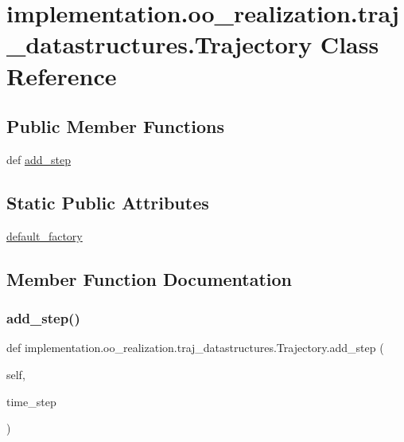 \hypertarget{classimplementation_1_1oo__realization_1_1traj__datastructures_1_1_trajectory}{}\section{implementation.\+oo\+\_\+realization.\+traj\+\_\+datastructures.\+Trajectory Class Reference}
\label{classimplementation_1_1oo__realization_1_1traj__datastructures_1_1_trajectory}
\subsection*{Public Member Functions}
\begin{DoxyCompactItemize}
\item 
def \hyperlink{classimplementation_1_1oo__realization_1_1traj__datastructures_1_1_trajectory_ac922486e57343dd01778b8d24455d9eb}{add\+\_\+step}
\end{DoxyCompactItemize}
\subsection*{Static Public Attributes}
\begin{DoxyCompactItemize}
\item 
\hyperlink{classimplementation_1_1oo__realization_1_1traj__datastructures_1_1_trajectory_ae72d432cf162b694f810b08a17cd25e7}{default\+\_\+factory}
\end{DoxyCompactItemize}


\subsection{Member Function Documentation}
\mbox{\label{classimplementation_1_1oo__realization_1_1traj__datastructures_1_1_trajectory_ac922486e57343dd01778b8d24455d9eb}} 
\subsubsection{\texorpdfstring{add\+\_\+step()}{add\_step()}}
{\footnotesize\ttfamily def implementation.\+oo\+\_\+realization.\+traj\+\_\+datastructures.\+Trajectory.\+add\+\_\+step (\begin{DoxyParamCaption}\item[{}]{self,  }\item[{}]{time\+\_\+step }\end{DoxyParamCaption})}



